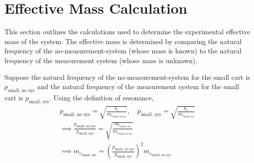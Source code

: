 \section{Effective Mass Calculation}
This section outlines the calculations used to determine the experimental effective mass of the system. The effective mass is determined by comparing the natural frequency of the no-measurement-system (whose mass is known) to the natural frequency of the measurement system (whose mass is unknown). 

Suppose the natural frequency of the no-measurement-system for the small cart is $p_{\text{small, no sys}}$ and the natural frequency of the measurement system for the small cart is $p_{\text{small, sys}}$. Using the definition of resonance,
\begin{gather*}
    p_{\text{small, no sys}} = \sqrt{\frac{k_e}{m_{e_{\text{small, no sys}}}}}, \quad p_{\text{small, sys}} = \sqrt{\frac{k_{e}}{m_{e_{\text{small, sys}}}}} \\
    \implies \frac{p_{\text{small, no sys}}}{p_{\text{small, sys}}} = \sqrt{\frac{m_{e_{\text{small, sys}}}}{m_{e_{\text{small, no sys}}}}} \\
    \implies m_{e_{\text{small, sys}}} = \left(\frac{p_{\text{small, no sys}}}{p_{\text{small, sys}}}\right)^2 m_{e_{\text{small, no sys}}}
\end{gather*}


